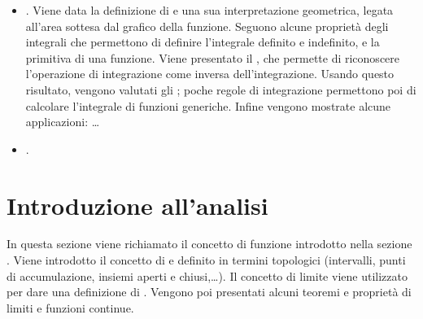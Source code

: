 \documentclass[letterpaper,10pt,italian]{jupyterBook}
\begin{document}
\begin{itemize}
\item {} 
\sphinxAtStartPar
{\hyperref[\detokenize{ch/infinitesimal_calculus/integrals:infinitesimal-calculus-integrals}]{}}. Viene data la definizione di  e una sua interpretazione geometrica, legata all’area sottesa dal grafico della funzione. Seguono alcune proprietà degli integrali che permettono di definire l’integrale definito e indefinito, e la primitiva di una funzione. Viene presentato il , che permette di riconoscere l’operazione di integrazione come inversa dell’integrazione. Usando questo risultato, vengono valutati gli ; poche regole di integrazione permettono poi di calcolare l’integrale di funzioni generiche. Infine vengono mostrate alcune applicazioni: … 

\item {} 
\sphinxAtStartPar
{\hyperref[\detokenize{ch/ode:ode-hs}]{}}. 

\end{itemize}



\sphinxstepscope


\section{Introduzione all’analisi}
\label{\detokenize{ch/infinitesimal_calculus/analysis:introduzione-all-analisi}}\label{\detokenize{ch/infinitesimal_calculus/analysis:infinitesimal-calculus-analysis}}\label{\detokenize{ch/infinitesimal_calculus/analysis::doc}}
\sphinxAtStartPar
In questa sezione viene richiamato il concetto di funzione introdotto nella sezione {\hyperref[\detokenize{ch/precalculus:math-hs-precalculus}]{}}. Viene introdotto il concetto di {\hyperref[\detokenize{ch/infinitesimal_calculus/analysis:infinitesimal-calculus-limits}]{}} e definito in termini topologici (intervalli, punti di accumulazione, insiemi aperti e chiusi,…). Il concetto di limite viene utilizzato per dare una definizione di {\hyperref[\detokenize{ch/infinitesimal_calculus::doc}]{}}. Vengono poi presentati alcuni teoremi e proprietà di limiti e funzioni continue.
\end{document}
